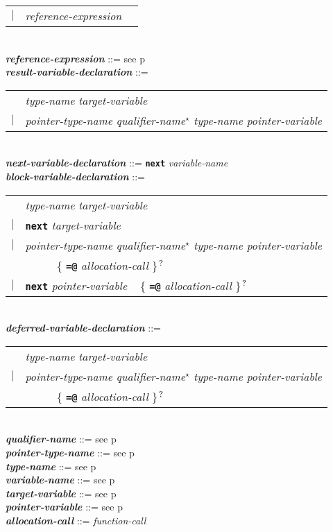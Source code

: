 \documentclass[12pt]{article}
\newcommand{\TT}[1]{{\tt \bfseries #1}}
\newcommand{\STAR}{{\Large $^\star$}}
\newcommand{\QMARK}{{$^{\,\mbox{\footnotesize ?}}$}}
\newcommand{\ttkey}[1]{{\tt \bfseries #1}}
\newcommand{\emkey}[1]{{\em \bfseries #1}}
\newcommand{\pagref}[1]{p\pageref{#1}}
\newenvironment{indpar}[1][0.3in]%
	{\begin{list}{}%
		     {\setlength{\itemsep}{0in}%
		      \setlength{\topsep}{0in}%
		      \setlength{\parsep}{1ex}%
		      \setlength{\labelwidth}{#1}%
		      \setlength{\leftmargin}{#1}%
		      \addtolength{\leftmargin}{\labelsep}}%
	 \item}%
	{\end{list}}
\begin{document}
\begin{indpar}
\begin{tabular}[t]{@{}rll}
    $|$ & {\em reference-expression}
    \end{tabular}
\\[0.5ex]
\emkey{reference-expression} ::= see \pagref{REFERENCE-EXPRESSIONS}
\\[0.5ex]
\emkey{result-variable-declaration}\label{RESULT-VARIABLE-DECLARATION} ::= \\
\hspace*{0.5in}\begin{tabular}{rl}
	    & {\em type-name} {\em target-variable} \\
	$|$ & {\em pointer-type-name} {\em qualifier-name}\STAR{}
	      {\em type-name} {\em pointer-variable}
	\end{tabular}
\\[0.5ex]
\emkey{next-variable-declaration}\label{NEXT-VARIABLE-DECLARATION}
    ::= \ttkey{next} {\em variable-name}
\\[0.5ex]
\emkey{block-variable-declaration}\label{BLOCK-VARIABLE-DECLARATION} ::= \\
\hspace*{0.5in}\begin{tabular}{rl}
	    & {\em type-name} {\em target-variable} \\
	$|$ & \TT{next} {\em target-variable} \\
	$|$ & {\em pointer-type-name} {\em qualifier-name}\STAR{}
	      {\em type-name} {\em pointer-variable} \\
	    & ~~~~~ \{ \TT{=@} {\em allocation-call} \}\QMARK{} \\
	$|$ & \TT{next} {\em pointer-variable}
	      ~ \{ \TT{=@} {\em allocation-call} \}\QMARK{} \\
	\end{tabular}
\\[0.5ex]
\emkey{deferred-variable-declaration}%
    \label{DEFERRED-VARIABLE-DECLARATION} ::= \\
\hspace*{0.5in}\begin{tabular}{rl}
	    & {\em type-name} {\em target-variable} \\
	$|$ & {\em pointer-type-name} {\em qualifier-name}\STAR{}
	      {\em type-name} {\em pointer-variable} \\
	    & ~~~~~ \{ \TT{=@} {\em allocation-call} \}\QMARK{} \\
	\end{tabular}
\\[0.5ex]
\emkey{qualifier-name} ::= see \pagref{QUALIFIER-NAME}
\\[0.5ex]
\emkey{pointer-type-name} ::= see \pagref{POINTER-TYPE-NAME}
\\[0.5ex]
\emkey{type-name} ::= see \pagref{TYPE-NAME}
\\[0.5ex]
\emkey{variable-name} ::= see \pagref{VARIABLE-NAME}
\\[0.5ex]
\emkey{target-variable} ::= see \pagref{TARGET-VARIABLE}
\\[0.5ex]
\emkey{pointer-variable} ::= see \pagref{POINTER-VARIABLE}
\\[0.5ex]
\emkey{allocation-call} ::= {\em function-call}
\end{indpar}
\end{document}
